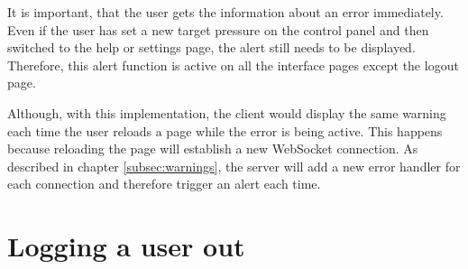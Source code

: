 It is important, that the user gets the information about an error immediately. Even if the user has set a new target pressure on the control panel and then switched to the help or settings page, the alert still needs to be displayed. Therefore, this alert function is active on all the interface pages except the logout page.

Although, with this implementation, the client would display the same warning each time the user reloads a page while the error is being active. This happens because reloading the page will establish a new WebSocket connection. As described in chapter \ref{subsec:warnings}, the server will add a new error handler for each connection and therefore trigger an alert each time. 






\section{Logging a user out}
\label{sec:logging_a_user_out}



